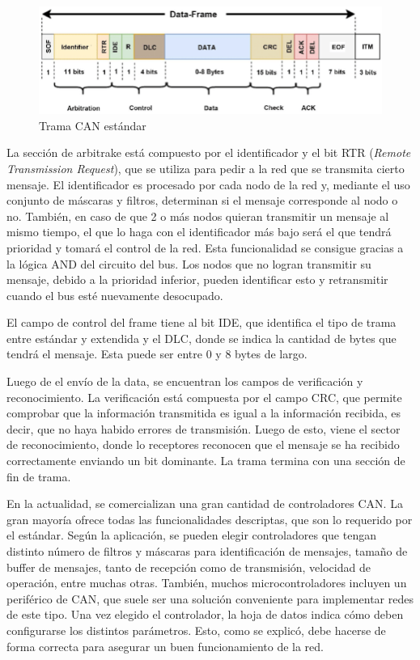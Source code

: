 \begin{figure}[htbp]
	\centering
	\includegraphics[scale=.5]{./Figures/CANBUS-frame.png}
	\caption{Trama CAN estándar\protect\footnotemark}
	\label{fig:trama_can}
\end{figure}


La sección de arbitrake está compuesto por el identificador y el bit RTR (\textit{Remote Transmission Request}), que se utiliza para pedir a la red que se transmita cierto mensaje. El identificador es procesado por cada nodo de la red y, mediante el uso conjunto de máscaras y filtros, determinan si el mensaje corresponde al nodo o no. También, en caso de que 2 o más nodos quieran transmitir un mensaje al mismo tiempo, el que lo haga con el identificador más bajo será el que tendrá prioridad y tomará el control de la red. Esta funcionalidad se consigue gracias a la lógica AND del circuito del bus. Los nodos que no logran transmitir su mensaje, debido a la prioridad inferior, pueden identificar esto y retransmitir cuando el bus esté nuevamente desocupado. 

El campo de control del frame tiene al bit IDE, que identifica el tipo de trama entre estándar y extendida y el DLC, donde se indica la cantidad de bytes que tendrá el mensaje. Esta puede ser entre 0 y 8 bytes de largo.

Luego de el envío de la data, se encuentran los campos de verificación y reconocimiento. La verificación está compuesta por el campo CRC, que permite comprobar que la información transmitida es igual a la información recibida, es decir, que no haya habido errores de transmisión. Luego de esto, viene el sector de reconocimiento, donde lo receptores reconocen que el mensaje se ha recibido correctamente enviando un bit dominante. La trama termina con una sección de fin de trama.

En la actualidad, se comercializan una gran cantidad de controladores CAN. La gran mayoría ofrece todas las funcionalidades descriptas, que son lo requerido por el estándar. Según la aplicación, se pueden elegir controladores que tengan distinto número de filtros y máscaras para identificación de mensajes, tamaño de buffer de mensajes, tanto de recepción como de transmisión, velocidad de operación, entre muchas otras. También, muchos microcontroladores incluyen un periférico de CAN, que suele ser una solución conveniente para implementar redes de este tipo. Una vez elegido el controlador, la hoja de datos indica cómo deben configurarse los distintos parámetros. Esto, como se explicó, debe hacerse de forma correcta para asegurar un buen funcionamiento de la red.

